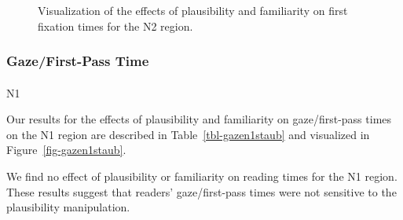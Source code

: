 \documentclass[
  12pt,
  letterpaper,
]{scrreprt}
\makeatletter
\let\oldparagraph\paragraph
\renewcommand{\paragraph}{
    \@ifstar
      \xxxParagraphStar
      \xxxParagraphNoStar
  }
\newcommand{\xxxParagraphStar}[1]{\oldparagraph*{#1}\mbox{}}
\newcommand{\xxxParagraphNoStar}[1]{\oldparagraph{#1}\mbox{}}
\makeatother
\begin{document}
\begin{figure}[htbp]

\caption{\label{fig-firstfixn2staub}Visualization of the effects of
plausibility and familiarity on first fixation times for the N2 region.}


\end{figure}%

\subsubsection{Gaze/First-Pass Time}\label{gazefirst-pass-time}

\paragraph{N1}\label{n1-1}

Our results for the effects of plausibility and familiarity on
gaze/first-pass times on the N1 region are described in
Table~\ref{tbl-gazen1staub} and visualized in
Figure~\ref{fig-gazen1staub}.

We find no effect of plausibility or familiarity on reading times for
the N1 region. These results suggest that readers' gaze/first-pass times
were not sensitive to the plausibility manipulation.
\end{document}
